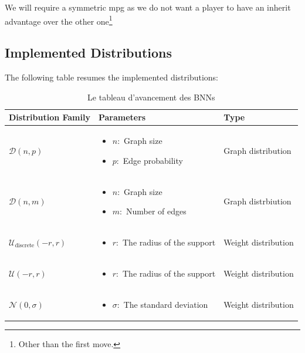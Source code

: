 We will require a symmetric \acrshort{mpg} as we do not want a player to have an inherit advantage over the other one\footnote{Other than the first move.}
\subsection{Implemented Distributions}
The following table resumes the implemented distributions:
\begin{table}[h]
	\small
	\begin{tabularx}{\textwidth}{| X | X | X |}
		\hline
		
		Distribution Family & Parameters & Type  \\
		\hline
		$\mathcal{D}(n,p)$ & \vspace{-5mm}
		\begin{itemize}
			  \setlength\itemsep{0em}
			\item $n:$ Graph size
			\item $p:$ Edge probability
		\end{itemize} & Graph distribution \\
		\hline
		$\mathcal{D}(n,m)$ & 
		\vspace{-5mm}
		\begin{itemize}
			  \setlength\itemsep{0em}
			\item $n:$ Graph size
			\item $m:$ Number of edges
		\end{itemize} & Graph distrbiution  \\
		\hline
		$\mathcal{U}_{\text{discrete}}(-r,r)$ &
		\vspace{-5mm}
		\begin{itemize}
			  \setlength\itemsep{0em}
			\item $r:$ The radius of the support
		\end{itemize}
		 &  Weight distribution\\
		\hline
		$\mathcal{U}(-r,r)$ &\vspace{-5mm}
		\begin{itemize}
			  \setlength\itemsep{0em}
			\item $r:$ The radius of the support
		\end{itemize} & Weight distribution \\
		\hline
		$\mathcal{N}(0,\sigma)$ &
		\vspace{-5mm}
		\begin{itemize}
			  \setlength\itemsep{0em}
			\item $\sigma:$ The standard deviation
		\end{itemize} & Weight distribution\\ 
		\hline 
		
	\end{tabularx}
	\caption{Le tableau d'avancement des BNNs
	\label{table:Distributions}}
\end{table}
